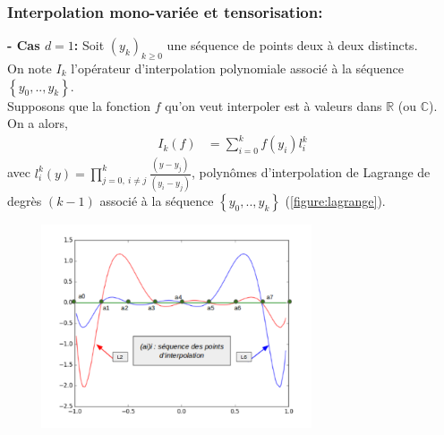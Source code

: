 \subsubsection{Interpolation mono-variée et tensorisation:}\label{sec:4.1.1}
\hspace{0.5cm}
\textbf{ - Cas $d=1$: }
Soit $(y_k)_{k \geq 0}$ une séquence de points deux à deux distincts. \\
On note $I_k$ l'opérateur d'interpolation polynomiale associé à la séquence $\left \{ y_0, .. , y_k \right \}$. \\
Supposons que la fonction $f$ qu'on veut interpoler est à valeurs dans $\mathbb{R}$ (ou $\mathbb{C}$).\\
On a alors,
\begin{align}
   I_k(f) & = \sum_{i=0}^k f(y_i) l_i^k \nonumber
\end{align}
avec $l_i^k(y) = \prod_{j=0,\ i \neq j}^k \frac{(y - y_j)}{(y_i - y_j)}$, polynômes d'interpolation de Lagrange
de degrès $(k-1)$ associé à la séquence $\left \{ y_0, .. , y_k \right \}$ (\ref{figure:lagrange}).\\
\begin{center}
\includegraphics[height=6cm,width=10cm]{images/lagrange_polynomials.png}
\label{figure:lagrange}
\end{center}

